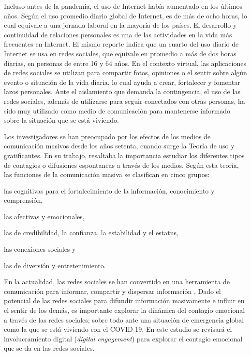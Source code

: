 \documentclass[spanish]{textolivre}
\begin{document}
Incluso antes de la pandemia, el uso de Internet había aumentado en los últimos años. Según \textcite{kemp2020} el uso promedio diario global de Internet, es de más de ocho horas, lo cual equivale a una jornada laboral en la mayoría de los países. El desarrollo y continuidad de relaciones personales es una de las actividades en la vida más frecuentes en Internet. El mismo reporte indica que un cuarto del uso diario de Internet se usa en redes sociales, que equivale en promedio a más de dos horas diarias, en personas de entre 16 y 64 años. En el contexto virtual, las aplicaciones de redes sociales se utilizan para compartir fotos, opiniones o el sentir sobre algún evento o situación de la vida diaria, lo cual ayuda a crear, fortalecer y fomentar lazos personales. Ante el aislamiento que demanda la contingencia, el uso de las redes sociales, además de utilizarse para seguir conectados con otras personas, ha sido muy utilizado como medio de comunicación para mantenerse informado sobre la situación que se está viviendo. 

Los investigadores se han preocupado por los efectos de los medios de comunicación masivos desde los años setenta, cuando surge la Teoría de uso y gratificantes. En su trabajo, \textcite{mcquail} resaltaba la importancia estudiar los diferentes tipos de contagios o difusiones espontaneas a través de los medios. Según esta teoría, las funciones de la comunicación masiva se clasifican en cinco grupos: 
\begin{enumerate*}[label=\arabic*)] 
\item las cognitivas para el fortalecimiento de la información, conocimiento y comprensión, 
\item las afectivas y emocionales, 
\item las de credibilidad, la confianza, la estabilidad y el estatus, 
\item las conexiones sociales y 
\item las de diversión y entretenimiento.
\end{enumerate*} 
En la actualidad, las redes sociales se han convertido en una herramienta de comunicación para informar, compartir y dispersar información \cite{huttHerrera2012}. Dado el potencial de las redes sociales para difundir información masivamente e influir en el sentir de los demás, es importante explorar la dinámica del contagio emocional a través de las redes sociales; sobre todo ante una situación de emergencia global como la que se está viviendo con el COVID-19. En este estudio se revisará el involucramiento digital (\textit{digital engagement}) para explorar el contagio emocional que se da en las redes sociales. 
\end{document}
